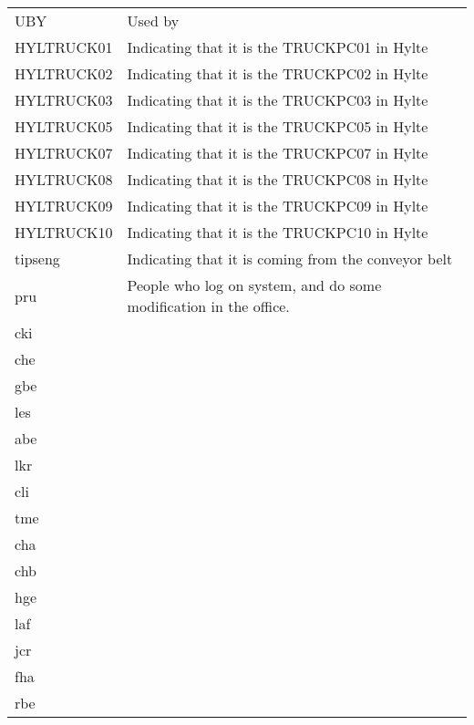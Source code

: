 \documentclass[a4paper]{report}
\begin{document}
\newpage
\begin{table}[h]
\begin{tabular}{| l | p{12cm} |}
	UBY & Used by \\
	HYLTRUCK01 & Indicating that it is the TRUCKPC01 in Hylte \\
	HYLTRUCK02 & Indicating that it is the TRUCKPC02 in Hylte \\
	HYLTRUCK03 & Indicating that it is the TRUCKPC03 in Hylte \\
	HYLTRUCK05 & Indicating that it is the TRUCKPC05 in Hylte \\
	HYLTRUCK07 & Indicating that it is the TRUCKPC07 in Hylte \\
	HYLTRUCK08 & Indicating that it is the TRUCKPC08 in Hylte \\
	HYLTRUCK09 & Indicating that it is the TRUCKPC09 in Hylte \\
	HYLTRUCK10 & Indicating that it is the TRUCKPC10 in Hylte \\
	tipseng & Indicating that it is coming from the conveyor belt \\
	pru & People who log on system, and do some modification in the office. \\
	cki &  \\
	che &  \\
	gbe &  \\
	les &  \\
	abe &  \\
	lkr &  \\
	cli &  \\
	tme &  \\
	cha &  \\
	chb &  \\
	hge &  \\
	laf &  \\
	jcr &  \\
	fha &  \\
	rbe &  \\

\end{tabular}
\end{table}	
\end{document}
